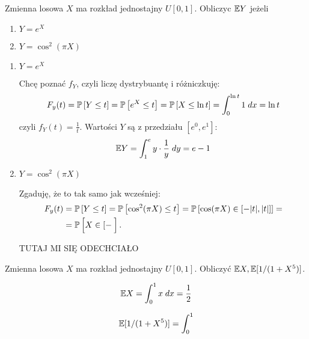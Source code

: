 \documentclass{article}
\begin{document}
\begin{problem}{}
  Zmienna losowa $X$ ma rozkład jednostajny $U[0, 1]$. Obliczyc $\mathbb{E} Y$ jeżeli

  \begin{enumerate}[label=\alph*)]
    \item $Y=e^X$
    \item $Y=\cos^2(\pi X)$
  \end{enumerate}
\end{problem}

\begin{enumerate}[label=\alph*)]
  \item $Y=e^X$
    
  Chcę poznać $f_Y$, czyli liczę dystrybuantę i różniczkuję:
  \begin{align*}
    F_y(t)=\prob{Y\leq t}=\prob{e^X\leq t}=\prob{X\leq \ln t}=\int_0^{\ln t}1\;dx=\ln t
  \end{align*}
  czyli $f_Y(t)=\frac{1}{t}$. Wartości $Y$ są z przedziału $[e^0, e^1]$:
  $$\mathbb{E} Y=\int_1^ey\cdot\frac{1}{y}\;dy=e-1$$
  
  \item $Y=\cos^2(\pi X)$

  Zgaduję, że to tak samo jak wcześniej:
  \begin{align*}
    F_y(t)&=\prob{Y\leq t}=\prob{\cos^2(\pi X)\leq t}=\prob{\cos(\pi X)\in[-|t|, |t|]}=\\
          &=\prob{X\in[-\frac{}{}}.
  \end{align*}

  {\large\color{red}TUTAJ MI SIĘ ODECHCIAŁO}

\end{enumerate}

\begin{problem}{}
  Zmienna losowa $X$ ma rozkład jednostajny $U[0, 1]$. Obliczyć $\mathbb{E} X, \mathbb{E}[1/(1+X^5)]$.
\end{problem}
$$\mathbb{E} X=\int_0^1x\;dx=\frac{1}{2}$$

\begin{align*}
  \mathbb{E}[1/(1+X^5)]=\int_0^1
\end{align*}
\end{document}
